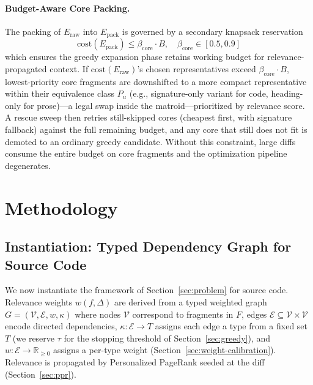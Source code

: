 \documentclass[11pt, a4paper]{article}
\begin{document}
\paragraph{Budget-Aware Core Packing.} The packing of $E_{\mathrm{raw}}$ into $E_{\mathrm{pack}}$ is governed by a secondary knapsack reservation
\begin{equation}
\mathrm{cost}(E_{\mathrm{pack}}) \leq \beta_{\mathrm{core}} \cdot B, \quad \beta_{\mathrm{core}} \in [0.5, 0.9]
\end{equation}
which ensures the greedy expansion phase retains working budget for relevance-propagated context. If $\mathrm{cost}(E_{\mathrm{raw}})$'s chosen representatives exceed $\beta_{\mathrm{core}} \cdot B$, lowest-priority core fragments are downshifted to a more compact representative within their equivalence class $P_u$ (e.g., signature-only variant for code, heading-only for prose)---a legal swap inside the matroid---prioritized by relevance score. A rescue sweep then retries still-skipped cores (cheapest first, with signature fallback) against the full remaining budget, and any core that still does not fit is demoted to an ordinary greedy candidate. Without this constraint, large diffs consume the entire budget on core fragments and the optimization pipeline degenerates.

\newpage
\section{Methodology}

\subsection{Instantiation: Typed Dependency Graph for Source Code}
\label{sec:tdg}

We now instantiate the framework of Section~\ref{sec:problem} for source code. Relevance weights $w(f, \Delta)$ are derived from a typed weighted graph $G = (\mathcal{V}, \mathcal{E}, w, \kappa)$ where nodes $\mathcal{V}$ correspond to fragments in $F$, edges $\mathcal{E} \subseteq \mathcal{V} \times \mathcal{V}$ encode directed dependencies, $\kappa : \mathcal{E} \to T$ assigns each edge a type from a fixed set $T$ (we reserve $\tau$ for the stopping threshold of Section~\ref{sec:greedy}), and $w : \mathcal{E} \to \mathbb{R}_{\geq 0}$ assigns a per-type weight (Section~\ref{sec:weight-calibration}). Relevance is propagated by Personalized PageRank seeded at the diff (Section~\ref{sec:ppr}).
\end{document}
